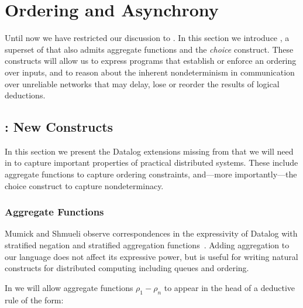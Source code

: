 \section{Ordering and Asynchrony}
\label{sec:async}

%    

Until now we have restricted our discussion to \slang.  In this section we
introduce \lang, a superset of \slang that also admits aggregate functions
and the \emph{choice} construct.  These constructs will allow us to
express programs that establish or enforce an ordering over inputs, and to
reason about the inherent nondeterminism in communication over unreliable
networks that may delay, lose or reorder the results of logical deductions. 

\subsection{\lang: New Constructs}

In this section we present the Datalog extensions missing from \slang that we will need in \lang to capture important properties of practical distributed systems.  These include aggregate functions to 
capture ordering constraints, and---more importantly---the choice construct to capture nondeterminacy.

\subsubsection{Aggregate Functions}
Mumick and Shmueli observe correspondences in the expressivity of Datalog with stratified negation and stratified aggregation functions~\cite{mumickshmueli}.  Adding aggregation to our language does not affect its expressive power, but is useful for writing natural constructs for distributed computing including queues and ordering.  

In \lang we will allow
aggregate functions $\rho_1 - \rho_n$ to appear
in the head of a deductive rule of the form:

